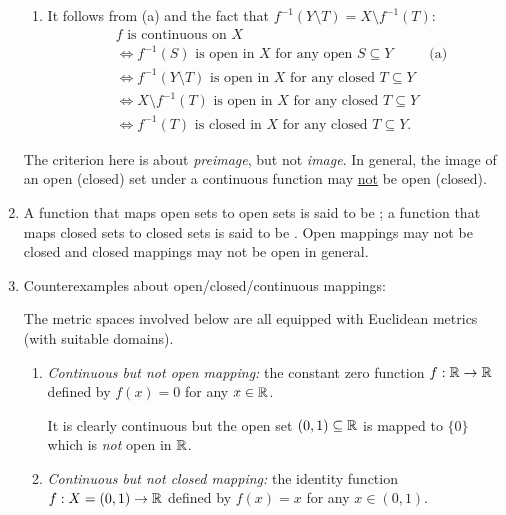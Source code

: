 \begin{enumerate}
\begin{pf}
\begin{enumerate}
\item It follows from (a) and the fact that \(f^{-1}(Y\setminus T)=X\setminus
f^{-1}(T)\):
\begin{align*}
&\text{\(f\) is continuous on \(X\)}\\
&\iff \text{\(f^{-1}(S)\) is open in \(X\) for any open \(S\subseteq Y\)}&\text{(a)}\\
&\iff \text{\(f^{-1}(Y\setminus T)\) is open in \(X\) for any closed \(T\subseteq Y\)}\\
&\iff \text{\(X\setminus f^{-1}(T)\) is open in \(X\) for any closed \(T\subseteq Y\)}\\
&\iff \text{\(f^{-1}(T)\) is closed in \(X\) for any closed \(T\subseteq Y\)}.
\end{align*}
\end{enumerate}
\end{pf}

\begin{warning}
The criterion here is about \emph{preimage}, but not \emph{image}. In general,
the image of an open (closed) set under a continuous function may
\underline{not} be open (closed).
\end{warning}

\item A function that maps open sets to open sets is said to be ; a
function that maps closed sets to closed sets is said to be . Open
mappings may not be closed and closed mappings may not be open in general.

\item Counterexamples about open/closed/continuous mappings:
\begin{note}
The metric spaces involved below are all equipped with Euclidean metrics (with
suitable domains).
\end{note}
\begin{enumerate}
\item \emph{Continuous but not open mapping:} the constant zero function
\(f:\mathbb{R}\to\mathbb{R}\) defined by \(f(x)=0\) for any \(x\in\mathbb{R}\).

\begin{pf}
It is clearly continuous but the open set \((0,1)\subseteq\mathbb{R}\) is mapped to
\(\{0\}\) which is \emph{not} open in \(\mathbb{R}\).
\end{pf}

\item \emph{Continuous but not closed mapping:} the identity function
\(f:X=(0,1)\to\mathbb{R}\) defined by \(f(x)=x\) for any \(x\in(0,1)\).


\end{enumerate}
\end{enumerate}
